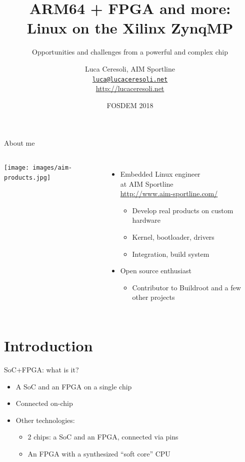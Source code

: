 \documentclass[xetex,table]{beamer}
\title{ARM64 + FPGA and more:\\Linux on the Xilinx ZynqMP}
\subtitle{Opportunities and challenges from a powerful and complex chip}
\author{Luca Ceresoli, AIM Sportline\\
  \href{mailto:luca@lucaceresoli.net}{\tt luca@lucaceresoli.net}\\
  \url{http://lucaceresoli.net}
}
\date{FOSDEM 2018}
\begin{document}
\maketitle

\begin{frame}{About me}
  \begin{columns}
    \texttt{[image: images/aim-products.jpg]}

    \begin{itemize}
    \item Embedded Linux engineer\\
      at AIM Sportline\\
      {\footnotesize\url{http://www.aim-sportline.com/}}
      \begin{itemize}
      \item Develop real products on custom hardware
      \item Kernel, bootloader, drivers
      \item Integration, build system
      \end{itemize}
    \item Open source enthusiast
      \begin{itemize}
      \item Contributor to Buildroot and a few other projects
      \end{itemize}
    \end{itemize}
  \end{columns}
\end{frame}

\section{Introduction}

\begin{frame}{SoC+FPGA: what is it?}
  \begin{itemize}
  \item A SoC and an FPGA on a single chip
  \item Connected on-chip
  \item Other technologies:
    \begin{itemize}
    \item 2 chips: a SoC and an FPGA, connected via pins
    \item An FPGA with a synthesized ``soft core'' CPU
    \end{itemize}
  \end{itemize}
\end{frame}
\end{document}
